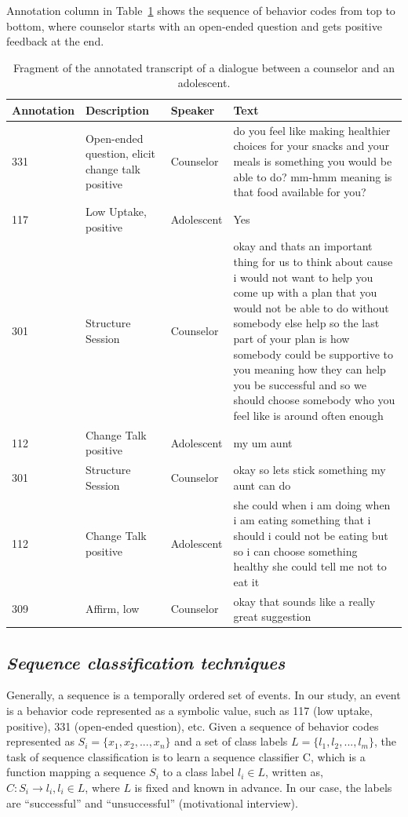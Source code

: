 \documentclass{amia}
\begin{document}
Annotation column in Table~\ref{tab:anno_examp} shows the sequence of behavior codes from top to bottom, where counselor starts with an open-ended question and gets positive feedback at the end. \\

\begin{table}[h]
\caption{Fragment of the annotated transcript of a dialogue between a counselor and an adolescent.}    
\label{tab:anno_examp}
\centering
\begin{tabular}{|l|p{3.6cm}|l|p{8cm}|}
\hline
Annotation  & Description & Speaker & Text \\\hline
331 &	Open-ended question, elicit change talk positive &	Counselor &	do you feel like making healthier choices for your snacks and your meals is something you would be able to do? mm-hmm meaning is that food available for you? \\\hline
117 &	Low Uptake, positive	& Adolescent &	Yes \\\hline
301 &	Structure Session	& Counselor &	okay and thats an important thing for us to think about cause i would not want to help you come up with a plan that you would not be able to do without somebody else help so the last part of your plan is how somebody could be supportive to you meaning how they can help you be successful and so we should choose somebody who you feel like is around often enough \\\hline
112 &	Change Talk positive	& Adolescent &	my um aunt \\\hline
301 &	Structure Session	& Counselor &	okay so lets stick something my aunt can do \\\hline
112 &	Change Talk positive &	Adolescent &	she could when i am doing when i am eating something that i should i could not be eating but so i can choose something healthy she could tell me not to eat it \\\hline
309 &	Affirm, low &	Counselor &	okay that sounds like a really great suggestion \\\hline
\end{tabular}
\end{table}  

\subsection*{\textit{Sequence classification techniques}}

Generally, a sequence is a temporally ordered set of events. In our study, an event is a behavior code represented as a symbolic value, such as 117 (low uptake, positive), 331 (open-ended question), etc.  Given a sequence of behavior codes represented as $S_i = \{x_1, x_2,...,x_n\}$ and a set of class labels $L = \{l_1, l_2,...,l_m\}$, the task of sequence classification is to learn a sequence classifier C, which is a function mapping a sequence $S_i$ to a class label $l_i \in L$, written as, $C : S_i \to l_i, l_i \in L$, where $L$ is fixed and known in advance. In our case, the labels are ``successful'' and ``unsuccessful'' (motivational interview).
\end{document}
